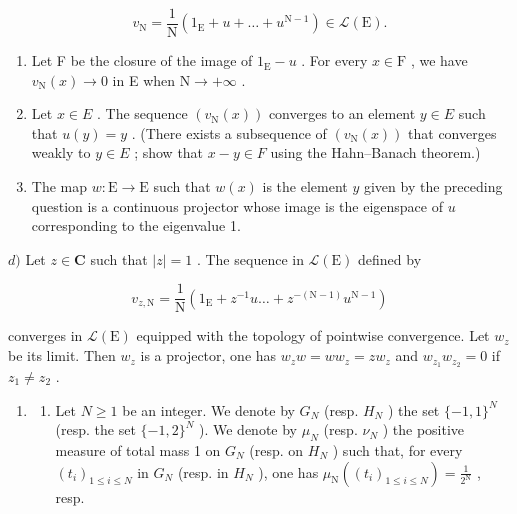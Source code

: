 \[
v _ {\mathrm{N}} = \frac {1}{\mathrm{N}} (1 _ {\mathrm{E}} + u + \dots + u ^ {\mathrm{N-1}}) \in \mathcal {L} (\mathrm{E}).
\]

\begin{enumerate}
\def\labelenumi{\alph{enumi})}
\item
  Let F be the closure of the image of \(1_{\mathrm{E}} - u\) . For every \(x \in \mathrm{F}\) , we have \(v_{\mathrm{N}}(x) \to 0\) in E when \(\mathrm{N} \to +\infty\) .
\item
  Let \(x \in E\) . The sequence \((v_{\mathrm{N}}(x))\) converges to an element \(y \in E\) such that \(u(y) = y\) . (There exists a subsequence of \((v_{\mathrm{N}}(x))\) that converges weakly to \(y \in E\) ; show that \(x - y \in F\) using the Hahn--Banach theorem.)
\item
  The map \(w \colon \mathrm{E} \to \mathrm{E}\) such that \(w(x)\) is the element \(y\) given by the preceding question is a continuous projector whose image is the eigenspace of \(u\) corresponding to the eigenvalue 1.
\end{enumerate}

\(d)\) Let \(z \in \mathbf{C}\) such that \(|z| = 1\) . The sequence in \(\mathcal{L}(\mathrm{E})\) defined by

\[
v _ {z, \mathrm{N}} = \frac {1}{\mathrm{N}} (1 _ {\mathrm{E}} + z ^ {- 1} u \dots + z ^ {- (\mathrm{N-1})} u ^ {\mathrm{N-1}})
\]

converges in \(\mathcal{L}(\mathrm{E})\) equipped with the topology of pointwise convergence. Let \(w_{z}\) be its limit. Then \(w_{z}\) is a projector, one has \(w_{z}w = ww_{z} = zw_{z}\) and \(w_{z_1}w_{z_2} = 0\) if \(z_{1} \neq z_{2}\) .

\begin{enumerate}
\def\labelenumi{\arabic{enumi})}
\setcounter{enumi}{24}
\tightlist
\item
  \begin{enumerate}
  \def\labelenumii{\alph{enumii})}
  \tightlist
  \item
    Let \(N \geqslant 1\) be an integer. We denote by \(G_{N}\) (resp. \(H_{N}\) ) the set \(\{-1,1\}^{N}\) (resp. the set \(\{-1,2\}^{N}\) ). We denote by \(\mu_{N}\) (resp. \(\nu_{N}\) ) the positive measure of total mass 1 on \(G_{N}\) (resp. on \(H_{N}\) ) such that, for every \((t_{i})_{1 \leqslant i \leqslant N}\) in \(G_{N}\) (resp. in \(H_{N}\) ), one has \(\mu_{\mathrm{N}}((t_{i})_{1 \leqslant i \leqslant N}) = \frac{1}{2^{\mathrm{N}}}\) , resp.
  \end{enumerate}
\end{enumerate}

